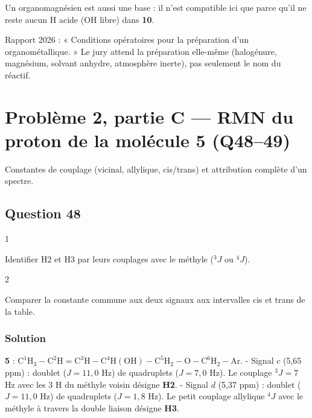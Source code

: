 \documentclass[11pt,a4paper]{article}
\begin{document}
\begin{piege}

Un organomagnésien est aussi une base : il n'est compatible ici que parce qu'il ne reste aucun H acide (OH libre) dans \textbf{10}.

\end{piege}

\begin{jury}

Rapport 2026 : « Conditions opératoires pour la préparation d'un organométallique. » Le jury attend la préparation elle-même (halogénure, magnésium, solvant anhydre, atmosphère inerte), pas seulement le nom du réactif.

\end{jury}

\hypertarget{probluxe8me-2-partie-c-rmn-du-proton-de-la-moluxe9cule-5-q4849}{%
\section{Problème 2, partie C --- RMN du proton de la molécule 5 (Q48--49)}\label{probluxe8me-2-partie-c-rmn-du-proton-de-la-moluxe9cule-5-q4849}}

Constantes de couplage (vicinal, allylique, cis/trans) et attribution complète d'un spectre.

\hypertarget{question-48}{%
\subsection{Question 48}\label{question-48}}

\begin{indication}{1}

Identifier H2 et H3 par leurs couplages avec le méthyle (\(^3J\) ou \(^4J\)).

\end{indication}

\begin{indication}{2}

Comparer la constante commune aux deux signaux aux intervalles cis et trans de la table.

\end{indication}

\hypertarget{solution-47}{%
\subsubsection{Solution}\label{solution-47}}

\textbf{5} : \(\mathrm{C^1H_3{-}C^2H{=}C^3H{-}C^4H(OH){-}C^5H_2{-}O{-}C^6H_2{-}Ar}\).
- Signal \(c\) (5,65 ppm) : doublet (\(J=11{,}0\) Hz) de quadruplets (\(J=7{,}0\) Hz). Le couplage \(^3J=7\) Hz avec les 3 H du méthyle voisin désigne \textbf{H2}.
- Signal \(d\) (5,37 ppm) : doublet (\(J=11{,}0\) Hz) de quadruplets (\(J=1{,}8\) Hz). Le petit couplage allylique \(^4J\) avec le méthyle à travers la double liaison désigne \textbf{H3}.
\end{document}
